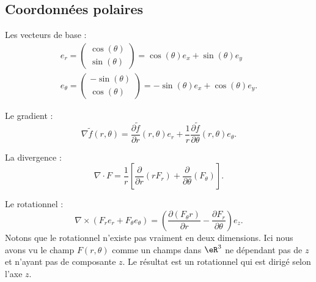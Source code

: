 \subsection{Coordonnées polaires}

Les vecteurs de base :
\begin{subequations}
    \begin{align}
    e_r=\begin{pmatrix}
        \cos(\theta)    \\ 
        \sin(\theta)    
    \end{pmatrix}=\cos(\theta)e_x+\sin(\theta)e_y\\
    e_{\theta}=\begin{pmatrix}
        -\sin(\theta)    \\ 
        \cos(\theta)    
    \end{pmatrix}=-\sin(\theta)e_x+\cos(\theta)e_y.
    \end{align}
\end{subequations}

Le gradient :
\begin{equation}
    \nabla\tilde f(r,\theta)=\frac{ \partial \tilde f }{ \partial r }(r,\theta)e_r+\frac{1}{ r }\frac{ \partial \tilde f }{ \partial \theta }(r,\theta)e_{\theta}.
\end{equation}

La divergence :
\begin{equation}    \label{EqgRxJKd}
    \nabla\cdot F=\frac{1}{ r }\left[ \frac{ \partial  }{ \partial r }(rF_r)+\frac{ \partial  }{ \partial \theta }(F_{\theta}) \right].
\end{equation}

Le rotationnel :
\begin{equation}    \label{EqtBnoCw}
    \nabla\times(F_re_r+F_{\theta}e_{\theta})=\left( \frac{ \partial (F_{\theta} r) }{ \partial r }-\frac{ \partial F_r }{ \partial \theta } \right)e_z.
\end{equation}
Notons que le rotationnel n'existe pas vraiment en deux dimensions. Ici nous avons vu le champ \( F(r,\theta)\) comme un champs dans \( \eR^3\) ne dépendant pas de \( z\) et n'ayant pas de composante \( z\). Le résultat est un rotationnel qui est dirigé selon l'axe \( z\).


